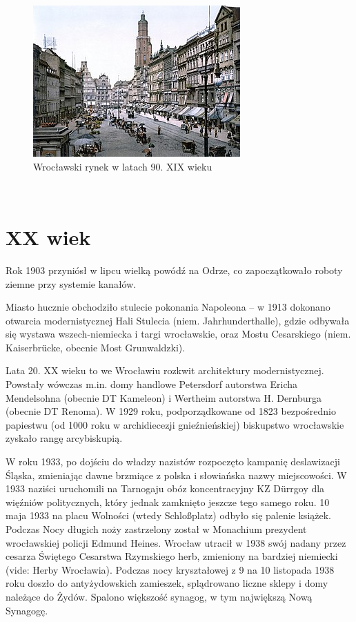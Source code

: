 \documentclass{article}
\begin{document}
\begin{figure}[htbp!!]
\centering
\includegraphics[scale=1.0]{10.jpg}
\caption{Wrocławski rynek w latach 90. XIX wieku}
\label{fig:10}
\end{figure}\

\newpage
\section{XX wiek}

Rok 1903 przyniósł w lipcu wielką powódź na Odrze, co zapoczątkowało roboty ziemne przy systemie kanałów.

Miasto hucznie obchodziło stulecie pokonania Napoleona – w 1913 dokonano otwarcia modernistycznej Hali Stulecia (niem. Jahrhunderthalle), gdzie odbywała się wystawa wszech-niemiecka i targi wrocławskie, oraz Mostu Cesarskiego (niem. Kaiserbrücke, obecnie Most Grunwaldzki).

Lata 20. XX wieku to we Wrocławiu rozkwit architektury modernistycznej. Powstały wówczas m.in. domy handlowe Petersdorf autorstwa Ericha Mendelsohna (obecnie DT Kameleon) i Wertheim autorstwa H. Dernburga (obecnie DT Renoma). W 1929 roku, podporządkowane od 1823 bezpośrednio papiestwu (od 1000 roku w archidiecezji gnieźnieńskiej) biskupstwo wrocławskie zyskało rangę arcybiskupią.

W roku 1933, po dojściu do władzy nazistów rozpoczęto kampanię deslawizacji Śląska, zmieniając dawne brzmiące z polska i słowiańska nazwy miejscowości. W 1933 naziści uruchomili na Tarnogaju obóz koncentracyjny KZ Dürrgoy dla więźniów politycznych, który jednak zamknięto jeszcze tego samego roku. 10 maja 1933 na placu Wolności (wtedy Schloßplatz) odbyło się palenie książek. Podczas Nocy długich noży zastrzelony został w Monachium prezydent wrocławskiej policji Edmund Heines. Wrocław utracił w 1938 swój nadany przez cesarza Świętego Cesarstwa Rzymskiego herb, zmieniony na bardziej niemiecki (vide: Herby Wrocławia). Podczas nocy kryształowej z 9 na 10 listopada 1938 roku doszło do antyżydowskich zamieszek, splądrowano liczne sklepy i domy należące do Żydów. Spalono większość synagog, w tym największą Nową Synagogę.
\end{document}
